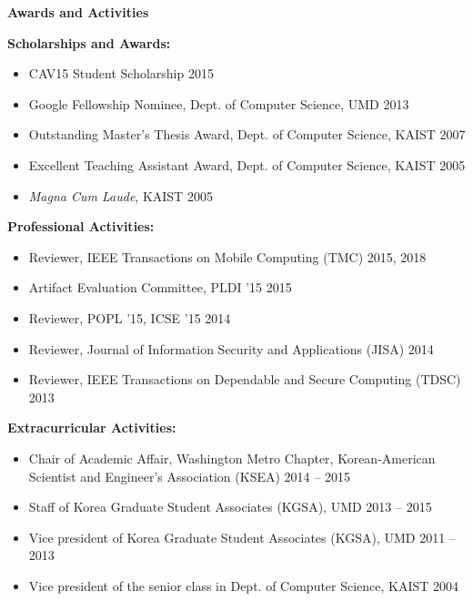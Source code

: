 \documentclass[letterpaper,11pt]{article}
\newcommand{\resheading}[1]{{\large \colorbox{mygrey}{\begin{minipage}{\textwidth}{\textbf{#1 \vphantom{p\^{E}}}}\end{minipage}}}}
\begin{document}

\resheading{Awards and Activities}
  \begin{description}
\item\textbf{Scholarships and Awards:}
\begin{itemize}
\item CAV15 Student Scholarship \hfill 2015
\item Google Fellowship Nominee, Dept. of Computer Science, UMD \hfill 2013 
\item Outstanding Master's Thesis Award, Dept. of Computer Science, KAIST \hfill 2007
\item Excellent Teaching Assistant Award, Dept. of Computer Science, KAIST \hfill 2005
\item \emph{Magna Cum Laude}, KAIST \hfill 2005
\end{itemize}
\item\textbf{Professional Activities:}
\begin{itemize}
\item Reviewer, IEEE Transactions on Mobile Computing (TMC) \hfill 2015, 2018
\item Artifact Evaluation Committee, PLDI '15 \hfill 2015
\item Reviewer, POPL '15, ICSE '15 \hfill 2014
\item Reviewer, Journal of Information Security and Applications (JISA) \hfill 2014
\item Reviewer, IEEE Transactions on Dependable and Secure Computing (TDSC) \hfill 2013
\end{itemize}
\item\textbf{Extracurricular Activities:}
\begin{itemize}
\item Chair of Academic Affair, Washington Metro Chapter, Korean-American Scientist and Engineer's Association (KSEA) \hfill 2014 -- 2015
\item Staff of Korea Graduate Student Associates (KGSA), UMD \hfill 2013 -- 2015
\item Vice president of Korea Graduate Student Associates (KGSA), UMD \hfill 2011 -- 2013
\item Vice president of the senior class in Dept. of Computer Science, KAIST \hfill 2004
\end{itemize}
  \end{description} %
\end{document}
